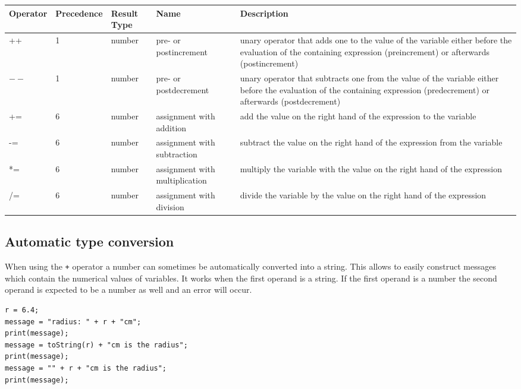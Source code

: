 \begin{center}
\begin{tabular}{|l|l|l|l|p{3cm}|}
\hline
Operator & Precedence & Result Type & Name & Description \\ \hline
++ & 1 & number & pre- or postincrement & unary operator that adds one to the value of the variable either before the evaluation of the containing expression (preincrement) or afterwards (postincrement) \\ \hline
$--$ & 1 & number & pre- or postdecrement & unary operator that subtracts one from the value of the variable either before the evaluation of the containing expression (predecrement) or afterwards (postdecrement) \\ \hline
+= & 6 & number & assignment with addition & add the value on the right hand of the expression to the variable  \\ \hline
-= & 6 & number & assignment with subtraction & subtract the value on the right hand of the expression from the variable  \\ \hline
*= & 6 & number & assignment with multiplication & multiply the variable with the value on the right hand of the expression\\ \hline
/= & 6 & number & assignment with division & divide the variable by the value on the right hand of the expression \\ \hline
\end{tabular}
\label{tbl:variable_operations}
\end{center}

\subsection{Automatic type conversion}

When using the {\tt +} operator a number can sometimes be automatically converted into a string. This allows to easily construct messages which contain the numerical values of variables. It works when the first operand is a string. If the first operand is a number the second operand is expected to be a number as well and an error will occur.

\begin{listing}[H]
\begin{verbatim}
r = 6.4;
message = "radius: " + r + "cm";
print(message);
message = toString(r) + "cm is the radius";
print(message);
message = "" + r + "cm is the radius";
print(message);
\end{verbatim}
\caption{A number is automatically converted into a string when the first operand of the + operator is a string.}
\label{lst:auto_conversion}
\end{listing}


